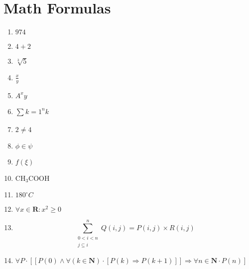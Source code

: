 \documentclass[12pt]{article}
\begin{document}
\maketitle

\section{Math Formulas}

\begin{enumerate}[label=(\alph*)]
\item $974$
\item $4 + 2$
\item $\sqrt[3]{5}$
\item $\frac{x}{y}$
\item $A^x y$
\item $\sum_{}^{} k = 1^n k$
\item $2 \neq 4$
\item $\phi \in \psi$
\item $f( \xi )$
\item CH$_{3}$COOH
\item $180^{\circ}C$
\item $\forall x \in \textbf{R} : x^2 \geq 0$
\item
	\begin{equation*}
		\sum_{\substack {0 < i < n\\{ j \subseteq i}} }^{n} Q(i,j) = P(i,j) \times R(i,j)
	\end{equation*}
\item $\forall P \cdot [[P(0) \wedge \forall(k \in \textbf{N}) \cdot [P(k) \Longrightarrow P(k+1)]] \Longrightarrow \forall n \in \textbf{N} \cdot P(n)]$
\end{enumerate}
\end{document}
